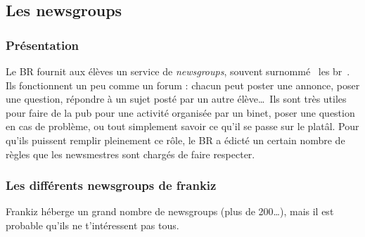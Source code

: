 \subsection{Les newsgroups}
\label{newsgroups}
\subsubsection{Présentation}
Le BR fournit aux élèves un service de \emph{newsgroups}, souvent surnommé \guillemotleft~les br~\guillemotright . Ils fonctionnent un peu comme un
forum : chacun peut poster une annonce, poser une question,
 répondre à un sujet posté par un autre élève\ldots\
Ils sont très utiles pour faire de la pub pour une activité
organisée par un binet, poser une question en cas de problème, ou
tout simplement savoir ce qu'il se passe sur le platâl. Pour qu'ils
puissent remplir pleinement ce rôle, le BR a édicté un certain
nombre de règles que les newsmestres sont chargés de faire
respecter.

\subsubsection{Les différents newsgroups de frankiz}
Frankiz héberge un grand nombre de newsgroups (plus de 200\dots ), mais il est probable qu'ils ne t'intéressent pas tous.

